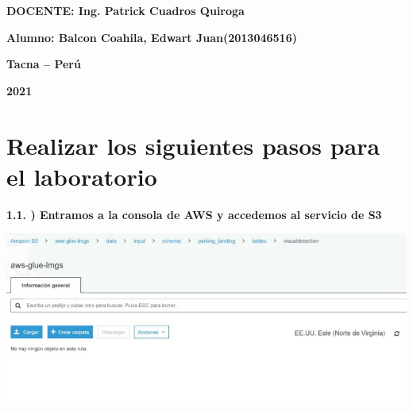 \documentclass{article}
\begin{document}
\begin{titlepage}
\begin{center}
\vspace*{0.3in}
\begin{Large}
\textbf{DOCENTE: Ing. Patrick Cuadros Quiroga} \\
\end{Large}

\vspace*{0.2in}
\vspace*{0.1in}
\begin{large}

\begin{Large}
\textbf{Alumno: Balcon Coahila, Edwart Juan\hfill	(2013046516) } \\
\end{Large}

\vspace*{0.15in}
\begin{Large}
\textbf{Tacna – Perú} \\
\end{Large}

\vspace*{0.05in}
\begin{Large}
\textbf{2021 } \\
\end{Large}

\end{large}
\end{center}

\end{titlepage}


\newpage

\section{ Realizar los siguientes pasos para el laboratorio }

\textbf{1.1.  ) Entramos a la consola de AWS y accedemos al servicio de S3}

\begin{center}
		\includegraphics[width=15cm]{./images/1} 
	\end{center}
	
\end{document}
